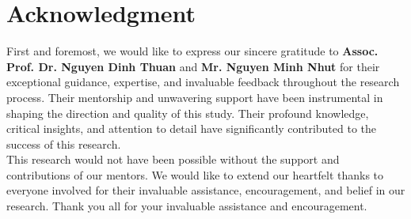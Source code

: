 \documentclass{ieeeojies}
\begin{document}
\section*{Acknowledgment}
First and foremost, we would like to express our sincere gratitude to \textbf{Assoc. Prof. Dr. Nguyen Dinh Thuan} and \textbf{Mr. Nguyen Minh Nhut} for their exceptional guidance, expertise, and invaluable feedback throughout the research process. Their mentorship and unwavering support have been instrumental in shaping the direction and quality of this study. Their profound knowledge, critical insights, and attention to detail have significantly contributed to the success of this research.
\\This research would not have been possible without the support and contributions of our mentors. We would like to extend our heartfelt thanks to everyone involved for their invaluable assistance, encouragement, and belief in our research. Thank you all for your invaluable assistance and encouragement.
\end{document}
